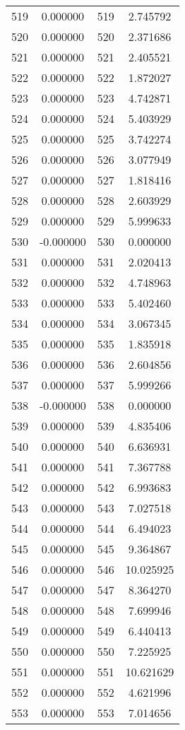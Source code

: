 \documentclass[12pt]{article}
\begin{document}
\begin{longtable}{@{}cccc@{}}
519 & 0.000000 & 519 & 2.745792 \\
520 & 0.000000 & 520 & 2.371686 \\
521 & 0.000000 & 521 & 2.405521 \\
522 & 0.000000 & 522 & 1.872027 \\
523 & 0.000000 & 523 & 4.742871 \\
524 & 0.000000 & 524 & 5.403929 \\
525 & 0.000000 & 525 & 3.742274 \\
526 & 0.000000 & 526 & 3.077949 \\
527 & 0.000000 & 527 & 1.818416 \\
528 & 0.000000 & 528 & 2.603929 \\
529 & 0.000000 & 529 & 5.999633 \\
530 & -0.000000 & 530 & 0.000000 \\
531 & 0.000000 & 531 & 2.020413 \\
532 & 0.000000 & 532 & 4.748963 \\
533 & 0.000000 & 533 & 5.402460 \\
534 & 0.000000 & 534 & 3.067345 \\
535 & 0.000000 & 535 & 1.835918 \\
536 & 0.000000 & 536 & 2.604856 \\
537 & 0.000000 & 537 & 5.999266 \\
538 & -0.000000 & 538 & 0.000000 \\
539 & 0.000000 & 539 & 4.835406 \\
540 & 0.000000 & 540 & 6.636931 \\
541 & 0.000000 & 541 & 7.367788 \\
542 & 0.000000 & 542 & 6.993683 \\
543 & 0.000000 & 543 & 7.027518 \\
544 & 0.000000 & 544 & 6.494023 \\
545 & 0.000000 & 545 & 9.364867 \\
546 & 0.000000 & 546 & 10.025925 \\
547 & 0.000000 & 547 & 8.364270 \\
548 & 0.000000 & 548 & 7.699946 \\
549 & 0.000000 & 549 & 6.440413 \\
550 & 0.000000 & 550 & 7.225925 \\
551 & 0.000000 & 551 & 10.621629 \\
552 & 0.000000 & 552 & 4.621996 \\
553 & 0.000000 & 553 & 7.014656 \\

\end{longtable}
\end{document}
